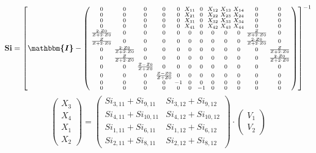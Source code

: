 \[ \mathbf{Si} = \left[ \boldsymbol{\mathbbm{I}}  -
\left(\begin{smallmatrix} 0 & 0 & 0 & 0 & 0 & X_{11} & 0 & X_{12} &
X_{13} & X_{14} & 0 & 0 \\ 0 & 0 & 0 & 0 & 0 & X_{21} & 0 & X_{22} &
X_{23} & X_{24} & 0 & 0 \\ 0 & 0 & 0 & 0 & 0 & X_{31} & 0 & X_{32} &
X_{33} & X_{34} & 0 & 0 \\ 0 & 0 & 0 & 0 & 0 & X_{41} & 0 & X_{42} &
X_{43} & X_{44} & 0 & 0 \\ \frac{2\cdot Z0}{Z+2\cdot Z0} & 0 & 0 & 0 &
0 & 0 & 0 & 0 & 0 & 0 & \frac{Z}{Z+2\cdot Z0} & 0 \\ \frac{Z}{Z+2\cdot
Z0} & 0 & 0 & 0 & 0 & 0 & 0 & 0 & 0 & 0 & \frac{2\cdot Z0}{Z+2\cdot
Z0} & 0 \\ 0 & \frac{2\cdot Z0}{Z+2\cdot Z0} & 0 & 0 & 0 & 0 & 0 & 0 &
0 & 0 & 0 & \frac{Z}{Z+2\cdot Z0} \\ 0 & \frac{Z}{Z+2\cdot Z0} & 0 & 0
& 0 & 0 & 0 & 0 & 0 & 0 & 0 & \frac{2\cdot Z0}{Z+2\cdot Z0} \\ 0 & 0 &
\frac{ Z -Z0}{ Z +Z0} & 0 & 0 & 0 & 0 & 0 & 0 & 0 & 0 & 0 \\ 0 & 0 & 0
& \frac{ Z -Z0}{ Z +Z0} & 0 & 0 & 0 & 0 & 0 & 0 & 0 & 0 \\ 0 & 0 & 0 &
0 & -1 & 0 & 0 & 0 & 0 & 0 & 0 & 0 \\ 0 & 0 & 0 & 0 & 0 & 0 & -1 & 0 &
0 & 0 & 0 & 0 \end{smallmatrix}\right) \right]^{-1} \]
\[ \left(\begin{array}{c} X_{3} \\ X_{4} \\ X_{1} \\ X_{2}
\end{array}\right)=\left(\begin{smallmatrix} Si_{3,11} + Si_{9,11} &
Si_{3,12} + Si_{9,12} \\ Si_{4,11} + Si_{10,11} & Si_{4,12} +
Si_{10,12} \\ Si_{1,11} + Si_{6,11} & Si_{1,12} + Si_{6,12} \\
Si_{2,11} + Si_{8,11} & Si_{2,12} + Si_{8,12}
\end{smallmatrix}\right)\cdot \left(\begin{array}{c} V_{1} \\ V_{2}
\end{array}\right) \]
